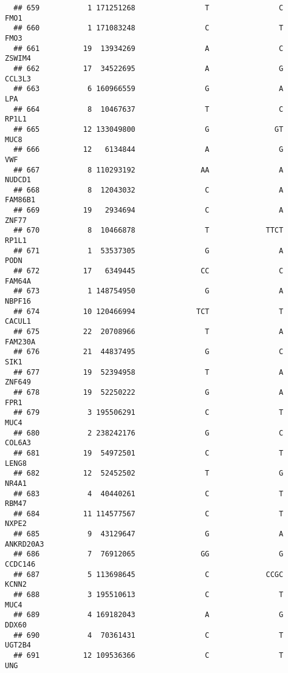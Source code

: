 \documentclass[12pt,twoside]{reedthesis}
\theoremstyle{definition}
\theoremstyle{definition}
\theoremstyle{remark}
\begin{document}
\begin{verbatim}
  ## 659           1 171251268                T                C           FMO1
  ## 660           1 171083248                C                T           FMO3
  ## 661          19  13934269                A                C         ZSWIM4
  ## 662          17  34522695                A                G         CCL3L3
  ## 663           6 160966559                G                A            LPA
  ## 664           8  10467637                T                C          RP1L1
  ## 665          12 133049800                G               GT           MUC8
  ## 666          12   6134844                A                G            VWF
  ## 667           8 110293192               AA                A         NUDCD1
  ## 668           8  12043032                C                A        FAM86B1
  ## 669          19   2934694                C                A          ZNF77
  ## 670           8  10466878                T             TTCT          RP1L1
  ## 671           1  53537305                G                A           PODN
  ## 672          17   6349445               CC                C         FAM64A
  ## 673           1 148754950                G                A         NBPF16
  ## 674          10 120466994              TCT                T         CACUL1
  ## 675          22  20708966                T                A        FAM230A
  ## 676          21  44837495                G                C           SIK1
  ## 677          19  52394958                T                A         ZNF649
  ## 678          19  52250222                G                A           FPR1
  ## 679           3 195506291                C                T           MUC4
  ## 680           2 238242176                G                C         COL6A3
  ## 681          19  54972501                C                T          LENG8
  ## 682          12  52452502                T                G          NR4A1
  ## 683           4  40440261                C                T          RBM47
  ## 684          11 114577567                C                T          NXPE2
  ## 685           9  43129647                G                A      ANKRD20A3
  ## 686           7  76912065               GG                G        CCDC146
  ## 687           5 113698645                C             CCGC          KCNN2
  ## 688           3 195510613                C                T           MUC4
  ## 689           4 169182043                A                G          DDX60
  ## 690           4  70361431                C                T         UGT2B4
  ## 691          12 109536366                C                T            UNG

\end{verbatim}
\end{document}
